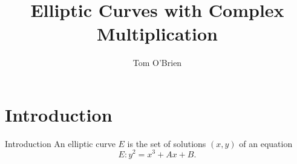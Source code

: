 \documentclass{beamer}
\title{Elliptic Curves with Complex Multiplication}
\author{Tom O'Brien}
\institute{Imperial College London}
\begin{document}
\begin{frame}
  \titlepage
\end{frame}

\section{Introduction}
\label{sec:introduction}

\begin{frame}{Introduction}
  An elliptic curve $E$ is the set of solutions $(x,y)$ of an equation
  \begin{equation*}
    E : y^{2} = x^{3} + Ax + B.
  \end{equation*}
  
\end{frame}
\end{document}
